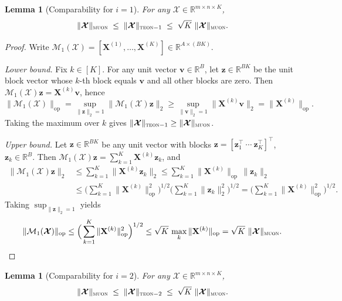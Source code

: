 \documentclass{article}
\newcommand{\ten}[1]{\bm{\mathcal{#1}}}
\newcommand{\mat}[1]{\mathbf{#1}}
\theoremstyle{plain}
\newtheorem{lemma}[theorem]{Lemma}
\theoremstyle{definition}
\theoremstyle{remark}
\begin{document}
\begin{lemma}[Comparability for $i=1$]
\label{lem:comp-i1}
For any $\ten{X}\in\mathbb{R}^{m\times n\times K}$,
\begin{equation}
\label{eq:comp-i1}
\|\ten{X}\|_{\textsc{muon}}
\;\le\;
\|\ten{X}\|_{\textsc{teon}-1}
\;\le\;
\sqrt{K}\ \|\ten{X}\|_{\textsc{muon}}.
\end{equation}
\end{lemma}

\begin{proof}
Write $\mathcal{M}_1(\ten{X})=[\mat{X}^{(1)},\dots,\mat{X}^{(K)}]\in\mathbb{R}^{A\times (BK)}$.

\emph{Lower bound.}
Fix $k\in[K]$. For any unit vector $\mat{v}\in\mathbb{R}^{B}$, let $\mat{z}\in\mathbb{R}^{BK}$ be the unit block vector
whose $k$-th block equals $\mat{v}$ and all other blocks are zero. Then
$\mathcal{M}_1(\ten{X})\mat{z}=\mat{X}^{(k)}\mat{v}$, hence
\[
\|\mathcal{M}_1(\ten{X})\|_{\mathrm{op}}
=
\sup_{\|\mat{z}\|_2=1}\|\mathcal{M}_1(\ten{X})\mat{z}\|_2
\ge
\sup_{\|\mat{v}\|_2=1}\|\mat{X}^{(k)}\mat{v}\|_2
=
\|\mat{X}^{(k)}\|_{\mathrm{op}}.
\]
Taking the maximum over $k$ gives $\|\ten{X}\|_{\textsc{teon}-1}\ge \|\ten{X}\|_{\textsc{muon}}$.

\emph{Upper bound.}
Let $\mat{z}\in\mathbb{R}^{BK}$ be any unit vector with blocks
$\mat{z}=[\mat{z}_1^\top~\cdots~\mat{z}_K^\top]^\top$, $\mat{z}_k\in\mathbb{R}^B$.
Then $\mathcal{M}_1(\ten{X})\mat{z}=\sum_{k=1}^K \mat{X}^{(k)}\mat{z}_k$, and
\begin{align*}
\|\mathcal{M}_1(\ten{X})\mat{z}\|_2
&\le
\sum_{k=1}^K \|\mat{X}^{(k)}\mat{z}_k\|_2
\le
\sum_{k=1}^K \|\mat{X}^{(k)}\|_{\mathrm{op}}\,\|\mat{z}_k\|_2 \\
&\le
\Big(\sum_{k=1}^K \|\mat{X}^{(k)}\|_{\mathrm{op}}^2\Big)^{1/2}
\Big(\sum_{k=1}^K \|\mat{z}_k\|_2^2\Big)^{1/2}
=
\Big(\sum_{k=1}^K \|\mat{X}^{(k)}\|_{\mathrm{op}}^2\Big)^{1/2}.
\end{align*}
Taking $\sup_{\|\mat{z}\|_2=1}$ yields
\[
\|\mathcal{M}_1(\ten{X})\|_{\mathrm{op}}
\le
\Big(\sum_{k=1}^K \|\mat{X}^{(k)}\|_{\mathrm{op}}^2\Big)^{1/2}
\le
\sqrt{K}\,\max_{k}\|\mat{X}^{(k)}\|_{\mathrm{op}}
=
\sqrt{K}\ \|\ten{X}\|_{\textsc{muon}}.
\]
\end{proof}

\begin{lemma}[Comparability for $i=2$]
\label{lem:comp-i2}
For any $\ten{X}\in\mathbb{R}^{m\times n\times K}$,
\begin{equation}
\label{eq:comp-i2}
\|\ten{X}\|_{\textsc{muon}}
\;\le\;
\|\ten{X}\|_{\textsc{teon}-2}
\;\le\;
\sqrt{K}\ \|\ten{X}\|_{\textsc{muon}}.
\end{equation}
\end{lemma}
\end{document}
